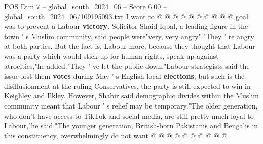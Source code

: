 \begin{textsample}{POS Dim 7 – global\_south\_2024\_06 – Score 6.00 – global\_south\_2024\_06/109195093.txt}
I want to @ @ @ @ @ @ @ @ @ @ goal was to prevent a Labour \textbf{victory}.
Solicitor Shaid Iqbal, a leading figure in the town ' s Muslim community, said people were"very, very angry"."They ' re angry at both parties.
But the fact is, Labour more, because they thought that Labour was a party which would stick up for human rights, speak up against atrocities,"he added."They ' ve let the public down."Labour strategists said the issue lost them \textbf{votes} during May ' s English local \textbf{elections}, but such is the disillusionment at the ruling Conservatives, the party is still expected to win in Keighley and Ilkley.
However, Shabir said demographic divides within the Muslim community meant that Labour ' s relief may be temporary."The older generation, who don't have access to TikTok and social media, are still pretty much loyal to Labour,"he said."The younger generation, British-born Pakistanis and Bengalis in this constituency, overwhelmingly do not want @ @ @ @ @ @ @ @ @ @

\end{textsample}
